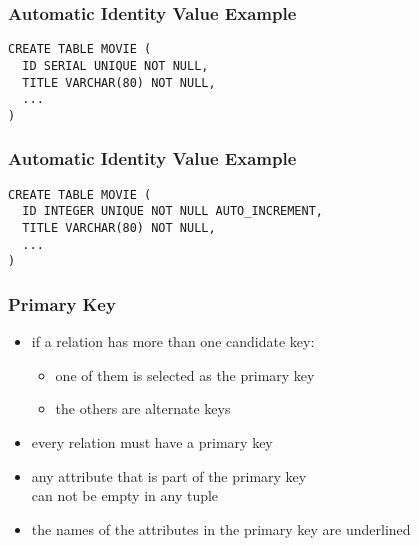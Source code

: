 \documentclass[dvipsnames]{beamer}
\theoremstyle{plain}
\begin{document}
\begin{frame}[fragile]
  \frametitle{Automatic Identity Value Example}

  \begin{example}[PostgreSQL]
    \begin{lstlisting}
CREATE TABLE MOVIE (
  ID SERIAL UNIQUE NOT NULL,
  TITLE VARCHAR(80) NOT NULL,
  ...
)
    \end{lstlisting}
  \end{example}
\end{frame}

\begin{frame}[fragile]
  \frametitle{Automatic Identity Value Example}

  \begin{example}[MySQL]
    \begin{lstlisting}
CREATE TABLE MOVIE (
  ID INTEGER UNIQUE NOT NULL AUTO_INCREMENT,
  TITLE VARCHAR(80) NOT NULL,
  ...
)
    \end{lstlisting}
  \end{example}
\end{frame}

\begin{frame}
  \frametitle{Primary Key}

  \begin{itemize}
    \item if a relation has more than one candidate key:
    \begin{itemize}
      \item one of them is selected as the \alert{primary key}
      \item the others are \alert{alternate keys}
    \end{itemize}

    \pause
    \item every relation must have a primary key

    \pause
    \item any attribute that is part of the primary key\\
      can not be empty in any tuple

    \pause
    \item the names of the attributes in the primary key are underlined
  \end{itemize}
\end{frame}
\end{document}
